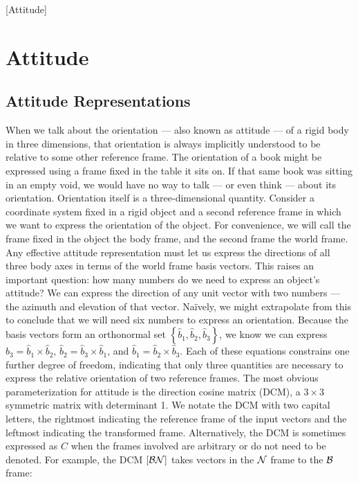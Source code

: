[Attitude]

\chapter{Attitude}

\section{Attitude Representations}

When we talk about the orientation ---  also known as attitude ---  of a rigid body in three dimensions, that orientation is always implicitly understood to be relative to some other reference frame. The orientation of a book might be expressed using a frame fixed in the table it sits on. If that same book was sitting in an empty void, we would have no way to talk ---  or even think ---  about its orientation. Orientation itself is a three-dimensional quantity. Consider a coordinate system fixed in a rigid object and a second reference frame in which we want to express the orientation of the object. For convenience, we will call the frame fixed in the object the body frame, and the second frame the world frame. Any effective attitude representation must let us express the directions of all three body axes in terms of the world frame basis vectors. This raises an important question: how many numbers do we need to express an object's attitude? We can express the direction of any unit vector with two numbers ---  the azimuth and elevation of that vector. Naïvely, we might extrapolate from this to conclude that we will need six numbers to express an orientation. Because the basis vectors form an orthonormal set $\left\{ \hat{b}_1, \hat{b}_2, \hat{b}_3\right\}$, we know we can express $\hat{b}_3 = \hat{b}_1 \times \hat{b}_2$, $\hat{b}_2 = \hat{b}_3 \times \hat{b}_1$, and $\hat{b}_1 = \hat{b}_2 \times \hat{b}_3$. Each of these equations constrains one further degree of freedom, indicating that only three quantities are necessary to express the relative orientation of two reference frames. The most obvious parameterization for attitude is the direction cosine matrix (DCM), a $3\times3$ symmetric matrix with determinant 1. We notate the DCM with two capital letters, the rightmost indicating the reference frame of the input vectors and the leftmost indicating the transformed frame. Alternatively, the DCM is sometimes expressed as $C$ when the frames involved are arbitrary or do not need to be denoted. For example, the DCM $\dcm{bn}$ takes vectors in the $\rf{n}$ frame to the $\rf{b}$ frame:

